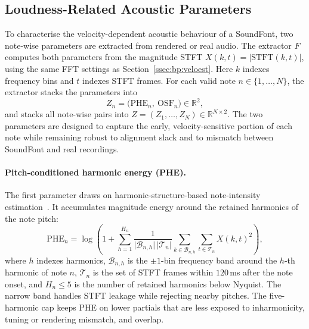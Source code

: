 \subsection{Loudness-Related Acoustic Parameters}
\label{ssec:bp:acoustic_params}

To characterise the velocity-dependent acoustic behaviour of a SoundFont, two note-wise parameters are extracted from rendered or real audio. The extractor $F$ computes both parameters from the magnitude STFT $X(k,t) = \lvert\mathrm{STFT}(k,t)\rvert$, using the same FFT settings as Section~\ref{ssec:bp:veloest}. Here $k$ indexes frequency bins and $t$ indexes STFT frames. For each valid note $n \in \{1, \ldots, N\}$, the extractor stacks the parameters into
\begin{equation}
\label{eq:bp_Z_def}
Z_n = \bigl(\mathrm{PHE}_n,\ \mathrm{OSF}_n\bigr) \in \mathbb{R}^2,
\end{equation}
and stacks all note-wise pairs into $Z = (Z_1, \ldots, Z_N) \in \mathbb{R}^{N \times 2}$. The two parameters are designed to capture the early, velocity-sensitive portion of each note while remaining robust to alignment slack and to mismatch between SoundFont and real recordings.

\paragraph{Pitch-conditioned harmonic energy (PHE).}
The first parameter draws on harmonic-structure-based note-intensity estimation~\cite{ewert2011est}. It accumulates magnitude energy around the retained harmonics of the note pitch:
\begin{equation}
\label{eq:bp_phe}
\mathrm{PHE}_n =
\log\!\left(1 + \sum_{h=1}^{H_n}
\frac{1}{\lvert\mathcal{B}_{n,h}\rvert\,\lvert\mathcal{T}_n\rvert}
\sum_{k \in \mathcal{B}_{n,h}} \sum_{t \in \mathcal{T}_n} X(k,t)^2 \right),
\end{equation}
where $h$ indexes harmonics, $\mathcal{B}_{n,h}$ is the $\pm 1$-bin frequency band around the $h$-th harmonic of note $n$, $\mathcal{T}_n$ is the set of STFT frames within $120$\,ms after the note onset, and $H_n \le 5$ is the number of retained harmonics below Nyquist. The narrow band handles STFT leakage while rejecting nearby pitches. The five-harmonic cap keeps PHE on lower partials that are less exposed to inharmonicity, tuning or rendering mismatch, and overlap.

